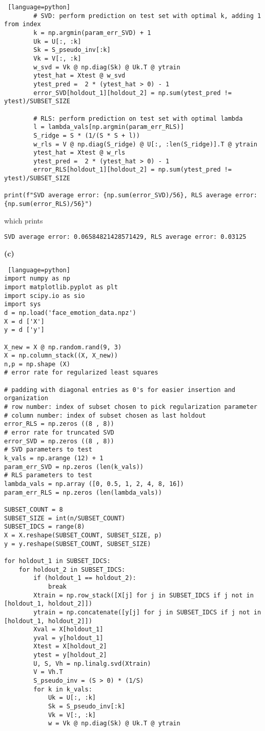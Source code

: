 \documentclass[a4paper, 12pt]{article}
\begin{document}
\begin{solution}
\begin{lstlisting} [language=python]
        # SVD: perform prediction on test set with optimal k, adding 1 from index
        k = np.argmin(param_err_SVD) + 1
        Uk = U[:, :k]
        Sk = S_pseudo_inv[:k]
        Vk = V[:, :k]
        w_svd = Vk @ np.diag(Sk) @ Uk.T @ ytrain
        ytest_hat = Xtest @ w_svd
        ytest_pred =  2 * (ytest_hat > 0) - 1
        error_SVD[holdout_1][holdout_2] = np.sum(ytest_pred != ytest)/SUBSET_SIZE
        
        # RLS: perform prediction on test set with optimal lambda
        l = lambda_vals[np.argmin(param_err_RLS)]
        S_ridge = S * (1/(S * S + l))
        w_rls = V @ np.diag(S_ridge) @ U[:, :len(S_ridge)].T @ ytrain
        ytest_hat = Xtest @ w_rls
        ytest_pred =  2 * (ytest_hat > 0) - 1
        error_RLS[holdout_1][holdout_2] = np.sum(ytest_pred != ytest)/SUBSET_SIZE

print(f"SVD average error: {np.sum(error_SVD)/56}, RLS average error: {np.sum(error_RLS)/56}")    
\end{lstlisting}
    which prints
    \begin{lstlisting}
SVD average error: 0.06584821428571429, RLS average error: 0.03125
\end{lstlisting}

    \textbf{(c)}
    \begin{lstlisting} [language=python]
import numpy as np
import matplotlib.pyplot as plt
import scipy.io as sio
import sys
d = np.load('face_emotion_data.npz')
X = d ['X']
y = d ['y']

X_new = X @ np.random.rand(9, 3)
X = np.column_stack((X, X_new))
n,p = np.shape (X)
# error rate for regularized least squares

# padding with diagonal entries as 0's for easier insertion and organization
# row number: index of subset chosen to pick regularization parameter
# column number: index of subset chosen as last holdout
error_RLS = np.zeros ((8 , 8))
# error rate for truncated SVD
error_SVD = np.zeros ((8 , 8))
# SVD parameters to test
k_vals = np.arange (12) + 1
param_err_SVD = np.zeros (len(k_vals))
# RLS parameters to test
lambda_vals = np.array ([0, 0.5, 1, 2, 4, 8, 16])
param_err_RLS = np.zeros (len(lambda_vals))

SUBSET_COUNT = 8
SUBSET_SIZE = int(n/SUBSET_COUNT)
SUBSET_IDCS = range(8)
X = X.reshape(SUBSET_COUNT, SUBSET_SIZE, p)
y = y.reshape(SUBSET_COUNT, SUBSET_SIZE)

for holdout_1 in SUBSET_IDCS:
    for holdout_2 in SUBSET_IDCS:
        if (holdout_1 == holdout_2):
            break
        Xtrain = np.row_stack([X[j] for j in SUBSET_IDCS if j not in [holdout_1, holdout_2]])
        ytrain = np.concatenate([y[j] for j in SUBSET_IDCS if j not in [holdout_1, holdout_2]])
        Xval = X[holdout_1]
        yval = y[holdout_1]
        Xtest = X[holdout_2]
        ytest = y[holdout_2]
        U, S, Vh = np.linalg.svd(Xtrain)
        V = Vh.T
        S_pseudo_inv = (S > 0) * (1/S)
        for k in k_vals:
            Uk = U[:, :k]
            Sk = S_pseudo_inv[:k]
            Vk = V[:, :k]
            w = Vk @ np.diag(Sk) @ Uk.T @ ytrain
            

\end{lstlisting}
\end{solution}
\end{document}

